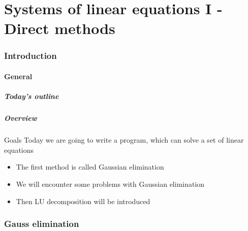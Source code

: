 \part{Systems of linear equations I - Direct methods}
\section{Introduction}
\subsection*{General}
\begin{frame}[label=contents_lin2]
  \frametitle{Today's outline}
\end{frame}

\begin{frame}
  \frametitle{Overview}
  \begin{block}{Goals}
    Today we are going to write a program, which can solve a set of linear equations
    \begin{itemize}
      \item The first method is called Gaussian elimination
      \item We will encounter some problems with Gaussian elimination
      \item Then LU decomposition will be introduced
  \end{itemize}
  \end{block}
\end{frame}

\section{Gauss elimination}
